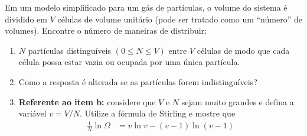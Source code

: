 \begin{prob}
	Em um modelo simplificado para um gás de partículas, o volume do sistema é dividido em
	 $V$ células de volume unitário (pode ser tratado como um “número” de volumes). Encontre o 
	 número	de maneiras de distribuir:
	 \begin{enumerate}[label=\alph *)]
	 	\item $N$ partículas distinguíveis $(0\leq N\leq V)$ entre $V$ células de modo que cada célula
	 	possa estar vazia ou ocupada por uma única partícula.
	 	\item Como a resposta é alterada se as partículas forem indistinguíveis?
	 	\item \textbf{Referente ao item b:} considere que $V$ e $N$ sejam muito grandes e defina a variável $v=V/N$.
	 	Utilize a fórmula de Stirling e mostre que
	 	\begin{align}
	 		\frac{1}{N}\ln \Omega&=v\ln v - (v-1)\ln (v-1)
	 	\end{align}
	 \end{enumerate}
\end{prob}

